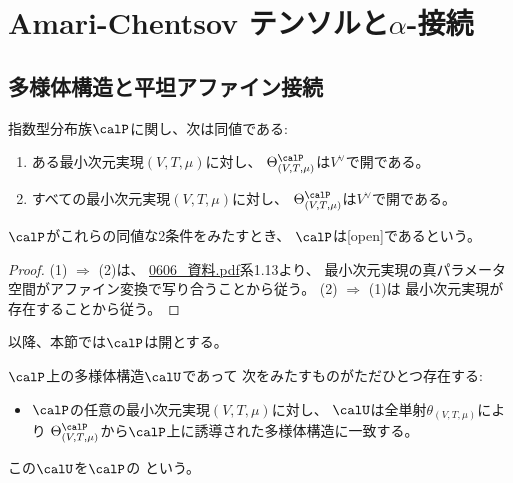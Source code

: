 \documentclass[report]{jlreq}
\begin{document}
%
\section{Amari-Chentsov テンソルと$\alpha$-接続}


\subsection{多様体構造と平坦アファイン接続}

\begin{propdef}
    指数型分布族$\calP$に関し、次は同値である:
    \begin{enumerate}
        \item ある最小次元実現$(V, T, \mu)$に対し、
            $\Theta^\calP_{(V, T, \mu)}$は$V^\vee$で開である。
        \item すべての最小次元実現$(V, T, \mu)$に対し、
            $\Theta^\calP_{(V, T, \mu)}$は$V^\vee$で開である。
    \end{enumerate}
    $\calP$がこれらの同値な2条件をみたすとき、
    $\calP$は[open]であるという。
\end{propdef}

\begin{proof}
    (1) $\Rightarrow$ (2)は、
    \url{0606_資料.pdf}系1.13より、
    最小次元実現の真パラメータ空間がアファイン変換で写り合うことから従う。
    (2) $\Rightarrow$ (1)は
    最小次元実現が存在することから従う。
\end{proof}

以降、本節では$\calP$は開とする。

\begin{propdef}
    $\calP$上の多様体構造$\calU$であって
    次をみたすものがただひとつ存在する:
    \begin{itemize}
        \item $\calP$の任意の最小次元実現$(V, T, \mu)$に対し、
            $\calU$は全単射$\theta_{(V, T, \mu)}$により
            $\Theta^\calP_{(V, T, \mu)}$から$\calP$上に誘導された多様体構造に一致する。
    \end{itemize}
    この$\calU$を$\calP$の
    という。
\end{propdef}
\end{document}
